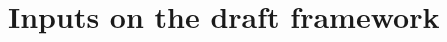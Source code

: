 \documentclass[11pt,a4paper]{article} \usepackage[parfill]{parskip}
\begin{document}

 

\section{Inputs on the draft framework}\label{s:comments}
\end{document}
